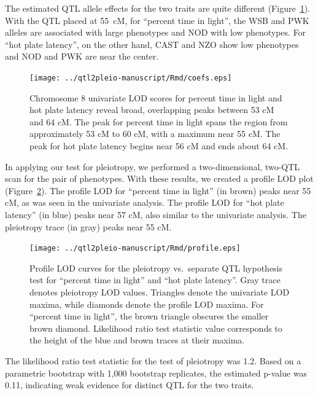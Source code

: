 \documentclass[oneside]{book}\usepackage[]{graphicx}\usepackage[]{color}
\begin{document}
The estimated QTL allele effects for the two traits are quite
different (Figure~\ref{fig:chr8-effects}).
With the QTL placed at 55~cM, for ``percent time in light'', the WSB and PWK alleles are associated
with large phenotypes and NOD with low phenotypes.
For ``hot plate latency'', on the other hand,
CAST and NZO show low phenotypes and NOD and PWK are near the center.

\begin{figure}
\texttt{[image: ../qtl2pleio-manuscript/Rmd/coefs.eps]}
\caption{Chromosome 8 univariate LOD scores for percent time in light
  and hot plate latency reveal broad, overlapping peaks between 53 cM
  and 64 cM. The peak for percent time in light spans the region from
  approximately 53 cM to 60 cM, with a maximum near 55 cM. The peak
  for hot plate latency begins near 56 cM and ends about 64 cM.}
\label{fig:chr8-effects}
\end{figure}

In applying our test for pleiotropy,  we performed a two-dimensional, two-QTL scan for the pair of
phenotypes. With these results, we created a profile LOD plot
(Figure~\ref{fig:profiles}). The profile LOD for ``percent
time in light'' (in brown) peaks near 55 cM, as was seen in the univariate
analysis.  The profile LOD for ``hot plate latency'' (in blue) peaks near 57 cM,
also similar to the univariate analysis.
The pleiotropy trace (in gray) peaks near 55 cM.

\begin{figure}
\texttt{[image: ../qtl2pleio-manuscript/Rmd/profile.eps]}
\caption{Profile LOD curves for the pleiotropy vs.\ separate QTL
  hypothesis test for ``percent time in light'' and ``hot plate latency''.
  Gray trace denotes pleiotropy LOD values. Triangles denote the
  univariate LOD maxima, while diamonds denote the profile LOD maxima.
  For ``percent time in light'', the brown triangle obscures the
  smaller brown diamond. Likelihood ratio test statistic value
  corresponds to the height of the blue and brown traces at their
  maxima.}
\label{fig:profiles}
\end{figure}

The likelihood ratio test statistic for the test of pleiotropy was
1.2. Based on a parametric bootstrap with 1,000 bootstrap replicates,
the estimated p-value was 0.11, indicating weak
evidence for distinct QTL for the two traits.
\end{document}
